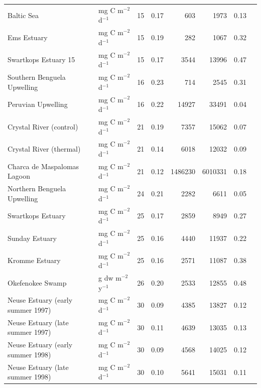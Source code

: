\documentclass[article]{jss}
\begin{document}
\begin{table}[ht]
\begin{center}
\begin{tiny}
\begin{tabular}{llrrrrrr}
      Baltic Sea & mg C m$^{-2}$ d$^{-1}$  &  15 & 0.17 & 603 & 1973 & 0.13 &   \citet{baird91} \\
      Ems Estuary & mg C m$^{-2}$ d$^{-1}$  &  15 & 0.19 & 282 & 1067 & 0.32 &  \citet{baird91} \\
      Swartkops Estuary  15 & mg C m$^{-2}$ d$^{-1}$  &  15 & 0.17 & 3544 & 13996 & 0.47 &   \citet{baird91} \\
      Southern Benguela Upwelling & mg C m$^{-2}$ d$^{-1}$  &  16 & 0.23 & 714 & 2545 & 0.31 & \citet{baird91} \\
      Peruvian Upwelling & mg C m$^{-2}$ d$^{-1}$  &  16 & 0.22 & 14927 & 33491 & 0.04 &  \citet{baird91} \\
      Crystal River (control) & mg C m$^{-2}$ d$^{-1}$  &  21 & 0.19 & 7357 & 15062 & 0.07 &  \citet{ulanowicz86} \\
      Crystal River (thermal) & mg C m$^{-2}$ d$^{-1}$  &  21 & 0.14 & 6018 & 12032 & 0.09 &  \citet{ulanowicz86} \\
      Charca de Maspalomas Lagoon & mg C m$^{-2}$ d$^{-1}$  &  21 & 0.12 & 1486230 & 6010331 & 0.18 &  \citet{almunia99} \\
      Northern Benguela Upwelling & mg C m$^{-2}$ d$^{-1}$  &  24 & 0.21 & 2282 & 6611 & 0.05 &  \citet{heymans00} \\
      Swartkops Estuary & mg C m$^{-2}$ d$^{-1}$  &  25 & 0.17 & 2859 & 8949 & 0.27 & \citet{scharler05} \\
      Sunday Estuary & mg C m$^{-2}$ d$^{-1}$  &  25 & 0.16 & 4440 & 11937 & 0.22 & \citet{scharler05} \\
      Kromme Estuary & mg C m$^{-2}$ d$^{-1}$  &  25 & 0.16 & 2571 & 11087 & 0.38 & \citet{scharler05} \\
      Okefenokee Swamp & g dw m$^{-2}$ y$^{-1}$  &  26 & 0.20 & 2533 & 12855 & 0.48 & \citet{whipple93} \\
      Neuse Estuary (early summer 1997) & mg C m$^{-2}$ d$^{-1}$  &  30 & 0.09 & 4385 & 13827 & 0.12 &  \citet{baird04} \\
      Neuse Estuary (late summer 1997)  & mg C m$^{-2}$ d$^{-1}$  &  30 & 0.11 & 4639 & 13035 & 0.13 &  \citet{baird04} \\
      Neuse Estuary (early summer 1998) & mg C m$^{-2}$ d$^{-1}$  &  30 & 0.09 & 4568 & 14025 & 0.12 &  \citet{baird04} \\
      Neuse Estuary (late summer 1998) & mg C m$^{-2}$ d$^{-1}$  &  30 & 0.10 & 5641 & 15031 & 0.11 &  \citet{baird04} \\

\end{tabular}
\end{tiny}
\end{center}
\end{table}
\end{document}
